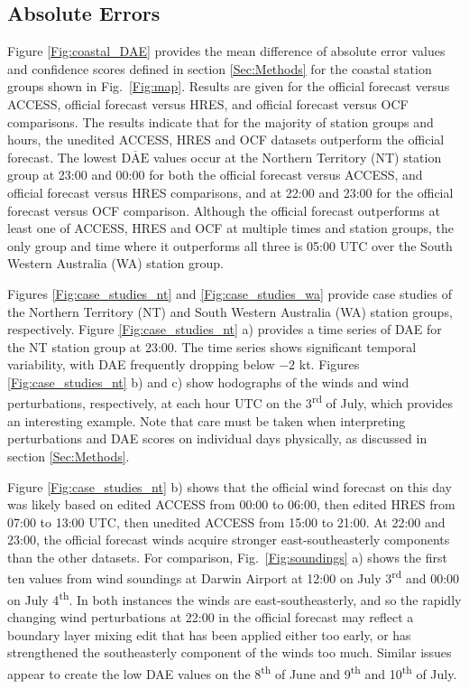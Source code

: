 \documentclass{ametsoc}
\begin{document}
\subsection{Absolute Errors}
\label{Sec:Daily}
Figure \ref{Fig:coastal_DAE} provides the mean difference of absolute error values and confidence scores defined in section \ref{Sec:Methods} for the coastal station groups shown in Fig.~\ref{Fig:map}. Results are given for the official forecast versus ACCESS, official forecast versus HRES, and official forecast versus OCF comparisons. The results indicate that for the majority of station groups and hours, the unedited ACCESS, HRES and OCF datasets outperform the official forecast. The lowest $\overline{\text{DAE}}$ values occur at the Northern Territory (NT) station group at 23:00 and 00:00 for both the official forecast versus ACCESS, and official forecast versus HRES comparisons, and at 22:00 and 23:00 for the official forecast versus OCF comparison. Although the official forecast outperforms at least one of ACCESS, HRES and OCF at multiple times and station groups, the only group and time where it outperforms all three is 05:00 UTC over the South Western Australia (WA) station group.

Figures \ref{Fig:case_studies_nt} and \ref{Fig:case_studies_wa} provide case studies of the Northern Territory (NT) and South Western Australia (WA) station groups, respectively. Figure \ref{Fig:case_studies_nt} a) provides a time series of DAE for the NT station group at 23:00. The time series shows significant temporal variability, with DAE frequently dropping below $-2$ kt. Figures \ref{Fig:case_studies_nt} b) and c) show hodographs of the winds and wind perturbations, respectively, at each hour UTC on the 3\textsuperscript{rd} of July, which provides an interesting example. Note that care must be taken when interpreting perturbations and DAE scores on individual days physically, as discussed in section \ref{Sec:Methods}. 

Figure \ref{Fig:case_studies_nt} b) shows that the official wind forecast on this day was likely based on edited ACCESS from 00:00 to 06:00, then edited HRES from 07:00 to 13:00 UTC, then unedited ACCESS from 15:00 to 21:00. At 22:00 and 23:00, the official forecast winds acquire stronger east-southeasterly components than the other datasets. For comparison, Fig.~\ref{Fig:soundings} a) shows the first ten values from wind soundings at Darwin Airport at 12:00 on July 3\textsuperscript{rd} and 00:00 on July 4\textsuperscript{th}. In both instances the winds are east-southeasterly, and so the rapidly changing wind perturbations at 22:00 in the official forecast may reflect a boundary layer mixing edit that has been applied either too early, or has strengthened the southeasterly component of the winds too much. Similar issues appear to create the low DAE values on the 8\textsuperscript{th} of June and 9\textsuperscript{th} and 10\textsuperscript{th} of July.
\end{document}
